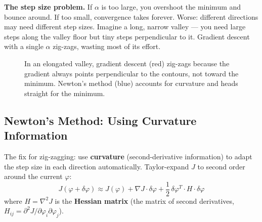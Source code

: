 \documentclass[12pt,a4paper]{article}
\begin{document}
\begin{warning}
\textbf{The step size problem.} If $\alpha$ is too large, you overshoot the minimum and bounce around. If too small, convergence takes forever. Worse: different directions may need different step sizes. Imagine a long, narrow valley --- you need large steps along the valley floor but tiny steps perpendicular to it. Gradient descent with a single $\alpha$ zig-zags, wasting most of its effort.
\end{warning}

\begin{figure}[H]
\centering
{}
\caption{In an elongated valley, gradient descent (red) zig-zags because the gradient always points perpendicular to the contours, not toward the minimum. Newton's method (blue) accounts for curvature and heads straight for the minimum.}
\label{fig:zigzag}
\end{figure}

\subsection{Newton's Method: Using Curvature Information}

The fix for zig-zagging: use \textbf{curvature} (second-derivative information) to adapt the step size in each direction automatically. Taylor-expand $J$ to second order around the current $\varphi$:
\begin{equation}
J(\varphi + \delta\varphi) \approx J(\varphi) + \nabla J \cdot \delta\varphi + \frac{1}{2}\,\delta\varphi^T\!\cdot H\cdot\delta\varphi
\end{equation}
where $H = \nabla^2 J$ is the \textbf{Hessian matrix} (the matrix of second derivatives, $H_{ij} = \partial^2 J / \partial\varphi_i\partial\varphi_j$).
\end{document}
